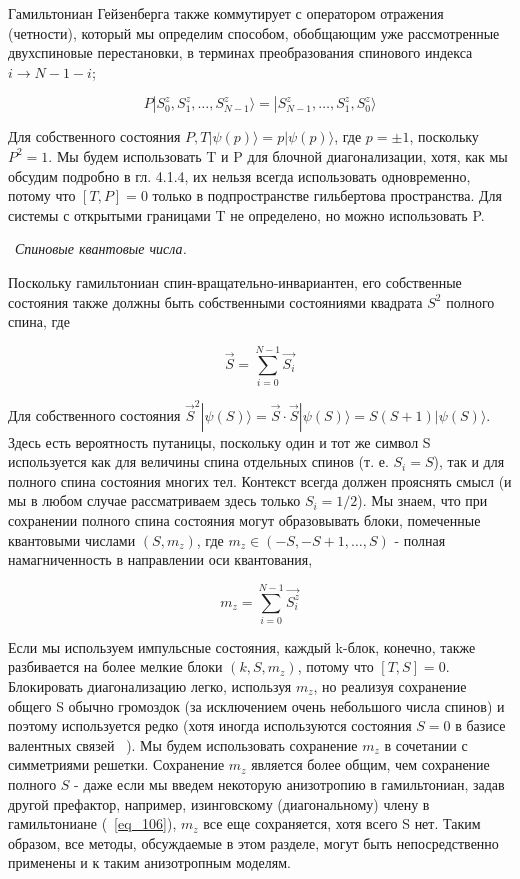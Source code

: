 \documentclass[11pt]{article}
\begin{document}
Гамильтониан Гейзенберга также коммутирует с оператором отражения (четности), который мы определим способом, обобщающим уже рассмотренные двухспиновые перестановки, в терминах преобразования спинового индекса $i \to N - 1 - i$;

\begin{equation}
P|S_0^z, S_1^z,\dots,S_{N-1}^z\rangle = |S_{N-1}^z, \dots, S_1^z,S_0^z\rangle
\label{eq_109}
\end{equation}

Для собственного состояния $P, T | \psi (p) \rangle = p | \psi (p) \rangle$, где $p = \pm 1$, поскольку $P^2 = 1$. Мы будем использовать T и P для блочной диагонализации, хотя, как мы обсудим подробно в гл. 4.1.4, их нельзя всегда использовать одновременно, потому что $[T, P] = 0$ только в подпространстве гильбертова пространства. Для системы с открытыми границами T не определено, но можно использовать P.

~\emph{Спиновые квантовые числа.}

Поскольку гамильтониан спин-вращательно-инвариантен, его собственные состояния также должны быть собственными состояниями квадрата $S^2$ полного спина, где

\begin{equation}
\vec S = \sum\limits_{i=0}^{N-1 }\vec{S_i}
\label{eq_110}
\end{equation}

Для собственного состояния $\vec{S}^2 | \psi (S) \rangle = \vec{S} · \vec{S} | \psi (S) \rangle = S (S + 1) | \psi (S) \rangle $. Здесь есть вероятность путаницы, поскольку один и тот же символ S используется как для величины спина отдельных спинов (т. е. $S_i = S$), так и для полного спина состояния многих тел. Контекст всегда должен прояснять смысл (и мы в любом случае рассматриваем здесь только $S_i = 1/2$).
Мы знаем, что при сохранении полного спина состояния могут образовывать блоки, помеченные квантовыми числами $(S, m_z)$, где $m_z \in (−S, −S + 1,\dots , S)$ - полная намагниченность в направлении оси квантования,

\begin{equation}
m_z = \sum\limits_{i=0}^{N-1 }\vec{S_i^z}
\label{eq_110}
\end{equation}

Если мы используем импульсные состояния, каждый k-блок, конечно, также разбивается на более мелкие блоки $(k, S, m_z)$, потому что $[T, S] = 0$. Блокировать диагонализацию легко, используя $m_z$, но реализуя сохранение общего S обычно громоздок (за исключением очень небольшого числа спинов) и поэтому используется редко (хотя иногда используются состояния $S = 0$ в базисе валентных связей ~\cite{prb_74_144422}). Мы будем использовать сохранение $m_z$ в сочетании с симметриями решетки. Сохранение $m_z$ является более общим, чем сохранение полного $S$ - даже если мы введем некоторую анизотропию в гамильтониан, задав другой префактор, например, изинговскому (диагональному) члену в гамильтониане (~\ref{eq_106}), $m_z$ все еще сохраняется, хотя всего S нет. Таким образом, все методы, обсуждаемые в этом разделе, могут быть непосредственно применены и к таким анизотропным моделям.
\end{document}
